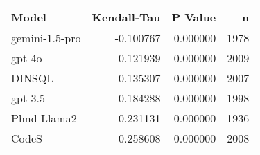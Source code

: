 \begin{tabular}{lrrr}
\toprule
Model & Kendall-Tau & P Value & n \\
\midrule
gemini-1.5-pro & -0.100767 & 0.000000 & 1978 \\
gpt-4o & -0.121939 & 0.000000 & 2009 \\
DINSQL & -0.135307 & 0.000000 & 2007 \\
gpt-3.5 & -0.184288 & 0.000000 & 1998 \\
Phnd-Llama2 & -0.231131 & 0.000000 & 1936 \\
CodeS & -0.258608 & 0.000000 & 2008 \\
\bottomrule
\end{tabular}
